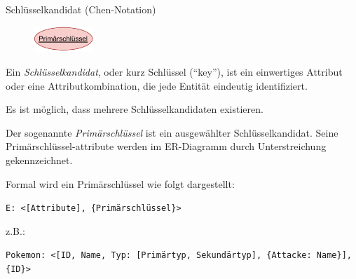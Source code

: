 \begin{defi}{Schlüsselkandidat (Chen-Notation)}
    \begin{figure}
        \begin{center}
            \includegraphics[width=0.2\textwidth]{includes/figures/definition_entity_relationship_model_attribute_primary.pdf}
        \end{center}
    \end{figure}
    Ein \emph{Schlüsselkandidat}, oder kurz Schlüssel (\enquote{key}), ist ein einwertiges Attribut oder eine Attributkombination, die jede Entität eindeutig identifiziert.

    Es ist möglich, dass mehrere Schlüsselkandidaten existieren.

    Der sogenannte \emph{Primärschlüssel} ist ein ausgewählter Schlüsselkandidat.
    Seine Primärschlüssel-attribute werden im ER-Diagramm durch Unterstreichung gekennzeichnet.

    Formal wird ein Primärschlüssel wie folgt dargestellt:
    \begin{center}
        \texttt{E: <[Attribute], \{Primärschlüssel\}>}
    \end{center}
    z.B.:
    \begin{center}
        \texttt{Pokemon: <[ID, Name, Typ: [Primärtyp, Sekundärtyp], \{Attacke: Name\}], \{ID\}>}
    \end{center}
\end{defi}

